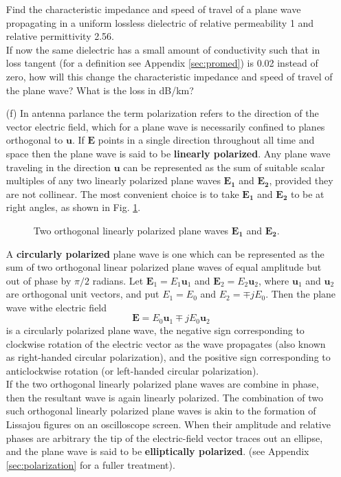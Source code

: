 \begin{itemize}
\noindent Find the characteristic impedance and speed of travel of a plane wave propagating in a uniform lossless dielectric of relative permeability 1 and relative permittivity 2.56.\\
If now the same dielectric has a small amount of conductivity such that in loss tangent (for a definition see Appendix \ref{sec:promed}) is 0.02 instead of zero, how will this change the characteristic impedance and speed of travel of the plane wave? What is the loss in dB/km?
	\item [(f)] 
	In antenna parlance the term polarization refers to the direction of the vector electric field, which for a plane wave is necessarily confined to planes orthogonal to $\mathbf{u}$. If $\mathbf{E}$ points in a single direction throughout all time and space then the plane wave is said to be \textbf{linearly polarized}. Any plane wave traveling in the direction $\mathbf{u}$ can be represented as the sum of suitable scalar multiples of any two linearly polarized plane waves $\mathbf{E_1}$ and $\mathbf{E_2}$, provided they are not collinear. The most convenient choice is to take $\mathbf{E_1}$ and $\mathbf{E_2}$ to be at right angles, as shown in Fig. \ref{fig:linpol}.
	\begin{figure}[htbp]
		\begin{center}
		\end{center}
		\caption{Two orthogonal linearly polarized plane waves $\mathbf{E_1}$ and $\mathbf{E_2}$.}
		\label{fig:linpol}
	\end{figure}
	A \textbf{circularly polarized} plane wave is one which can be represented as the sum of two orthogonal linear polarized plane waves of equal amplitude but out of phase by $\pi/2$ radians. Let $\mathbf{E}_1=E_1\mathbf{u}_1$ and $\mathbf{E}_2=E_2\mathbf{u}_2$, where $\mathbf{u}_1$ and $\mathbf{u}_2$ are orthogonal unit vectors, and put $E_1=E_0$ and $E_2=\mp jE_0$. Then the plane wave withe electric field
	\begin{equation}
	\mathbf{E}=E_0\mathbf{u}_1\mp jE_0\mathbf{u}_2
	\end{equation}
	is a circularly polarized plane wave, the negative sign corresponding to clockwise rotation of the electric vector as the wave propagates (also known as right-handed circular polarization), and the positive sign corresponding to anticlockwise rotation (or left-handed circular polarization).\\
	If the two orthogonal linearly polarized plane waves are combine in phase, then the resultant wave is again linearly polarized. The combination of two such orthogonal linearly polarized plane waves is akin to the formation of Lissajou figures on an oscilloscope screen. When their amplitude and relative phases are arbitrary the tip of the electric-field vector traces out an ellipse, and the plane wave is said to be \textbf{elliptically polarized}. (see Appendix \ref{sec:polarization} for a fuller treatment).\\

\end{itemize}

